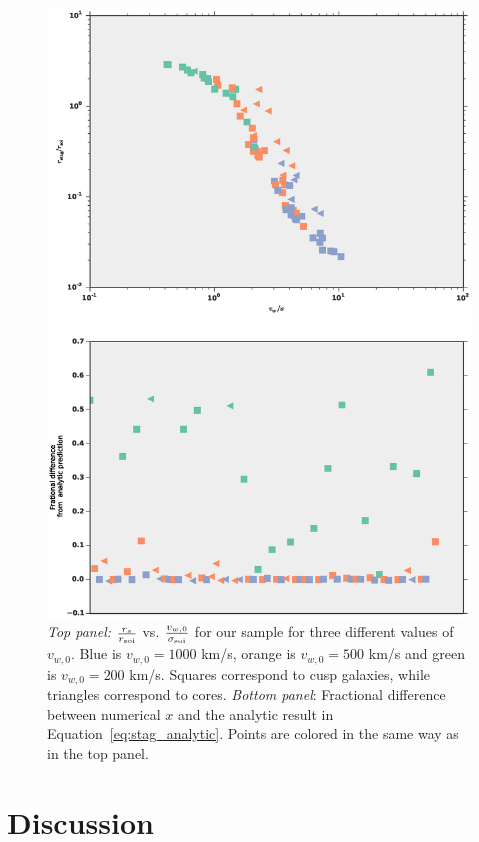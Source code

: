 \documentclass[usenatbib,fleqn]{mn2e}
\newcommand{\soi}{\rm soi}
\newcommand{\rsoi}{r_{\soi}}
\newcommand{\sigsoi}{\sigma_{\soi}}
\newcommand{\vwO}{v_{w,0}}
\newcommand{\x}{\frac{r_s}{\rsoi}}
\newcommand{\vwNorm}{\frac{\vwO}{\sigsoi}}
\begin{document}
\begin{figure}
  \includegraphics[width=\columnwidth]{rs.eps}
  \caption{\label{fig:stag} \emph{Top panel:} $\x$ vs. $\vwNorm$ for
    our sample for three different values of $\vwO$. Blue is
    $\vwO=1000$ km/s, orange is $\vwO=500$ km/s and green is
    $\vwO=200$ km/s. Squares correspond to cusp galaxies, while
    triangles correspond to cores. \emph{Bottom panel}: Fractional difference
    between numerical $x$ and the analytic result in
    Equation~\ref{eq:stag_analytic}. Points are colored in the same
    way as in the top panel.}
\end{figure}



\section{Discussion}
\end{document}
